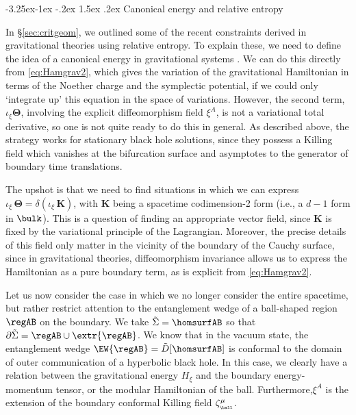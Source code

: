 \documentclass[12pt,openany]{book}
\makeatletter
\renewcommand\subsection{\@startsection{subsection}{2}{\z@}%
                                     {-3.25ex\@plus -1ex \@minus -.2ex}%
                                     {1.5ex \@plus .2ex}%
                                     {\normalfont\bfseries}}
\makeatother
\begin{document}
\subsection{Canonical energy and relative entropy}
\label{sec:cerel}

In \S\ref{sec:critgeom}, we outlined some of the recent constraints derived in gravitational theories using relative entropy. To explain these, we need to define the idea of a canonical energy in gravitational systems \cite{Lashkari:2016idm}. We can do this directly from \eqref{eq:Hamgrav2}, which gives the variation of the gravitational Hamiltonian in terms of the Noether charge and the symplectic potential, if we could  only `integrate up' this equation in the space of variations. However, the second term, $\iota_\xi  \bm{\Theta}$, involving the explicit diffeomorphism field $\xi^A$, is not a variational total derivative, so one is not quite ready to do this in general. As described above, the strategy works for stationary black hole solutions, since they possess a Killing field which vanishes at the bifurcation surface and asymptotes to the generator of boundary time translations.

The upshot is that we need to find situations in which we can express $\iota_\xi \, \bm{\Theta} = \delta \left( \iota_\xi \,\mathbf{K}\right)$, with $\mathbf{K}$ being a spacetime codimension-2 form (i.e., a $d-1$ form in $\bulk$). This is a question of finding an appropriate vector field, since $\mathbf{K}$ is fixed by the variational principle of the Lagrangian. Moreover, the precise details of this field only matter in the vicinity of the boundary of the Cauchy surface, since in gravitational theories, diffeomorphism invariance allows us to express the Hamiltonian as a pure boundary term, as is explicit from \eqref{eq:Hamgrav2}.

Let us now consider the case in which we no longer consider the entire spacetime, but rather restrict attention to the entanglement wedge of a ball-shaped region  $\regAB$ on the boundary. We take $\tilde{\Sigma} = \homsurfAB$ so that
$\partial \tilde{\Sigma} = \regAB \cup \extr{\regAB}$.  We know that in the vacuum state, the entanglement wedge
$\EW{\regAB} = \tilde{D}[{\homsurfAB}] $ is conformal to the  domain of outer communication of a hyperbolic black hole. In this case, we clearly have a relation between the gravitational energy $H_\xi$ and the boundary energy-momentum tensor, or the modular Hamiltonian of the ball. Furthermore,$\xi^A$ is the extension of the boundary conformal Killing field $\zeta^\mu_{_{\ball}}$.
\end{document}
